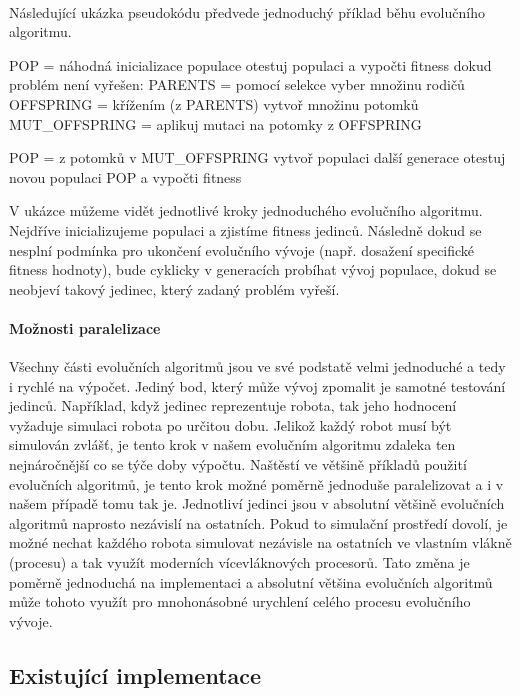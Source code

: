 \paragraph{}
Následující ukázka pseudokódu předvede jednoduchý příklad běhu evolučního
algoritmu. 
\pagebreak
\begin{code}
POP = náhodná inicializace populace
otestuj populaci a vypočti fitness
dokud problém není vyřešen:
    PARENTS = pomocí selekce vyber množinu rodičů
    OFFSPRING = křížením (z PARENTS) vytvoř množinu potomků
    MUT_OFFSPRING = aplikuj mutaci na potomky z OFFSPRING

    POP = z potomků v MUT_OFFSPRING vytvoř populaci další generace
    otestuj novou populaci POP a vypočti fitness
\end{code}

V ukázce můžeme vidět jednotlivé kroky jednoduchého evolučního algoritmu.
Nejdříve inicializujeme populaci a zjistíme fitness jedinců. Následně dokud se
nesplní podmínka pro ukončení evolučního vývoje (např. dosažení specifické
fitness hodnoty), bude cyklicky v generacích probíhat vývoj populace, dokud se
neobjeví takový jedinec, který zadaný problém vyřeší.

\paragraph{Možnosti paralelizace}
Všechny části evolučních algoritmů jsou ve své podstatě velmi jednoduché a tedy
i rychlé na výpočet. Jediný bod, který může vývoj zpomalit je samotné testování
jedinců. Například, když jedinec reprezentuje robota, tak jeho hodnocení
vyžaduje simulaci robota po určitou dobu. Jelikož každý robot musí být
simulován zvlášť, je tento krok v našem evolučním algoritmu zdaleka ten
nejnáročnější co se týče doby výpočtu. Naštěstí ve většině příkladů použití
evolučních algoritmů, je tento krok možné poměrně jednoduše paralelizovat a i v
našem případě tomu tak je. Jednotliví jedinci jsou v absolutní většině
evolučních algoritmů naprosto nezávislí na ostatních. Pokud to simulační
prostředí dovolí, je možné nechat každého robota simulovat nezávisle na
ostatních ve vlastním vlákně (procesu) a tak využít moderních vícevláknových
procesorů. Tato změna je poměrně jednoduchá na implementaci a absolutní většina
evolučních algoritmů může tohoto využít pro mnohonásobné urychlení celého
procesu evolučního vývoje.

\subsection{Existující implementace} \label{EA-impl}

